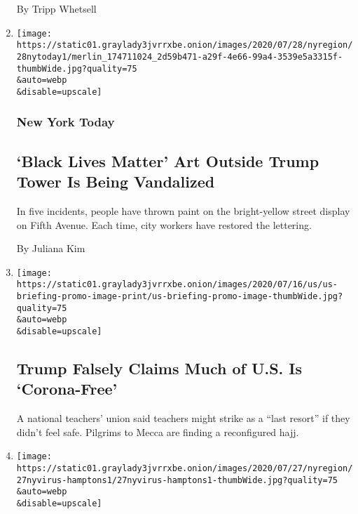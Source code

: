 \begin{enumerate}
  By Tripp Whetsell
\item
  \href{/2020/07/28/nyregion/blm-trump-tower.html}{}

  \texttt{[image: https://static01.graylady3jvrrxbe.onion/images/2020/07/28/nyregion/28nytoday1/merlin\_174711024\_2d59b471-a29f-4e66-99a4-3539e5a3315f-thumbWide.jpg?quality=75\\\&auto=webp\\\&disable=upscale]}

  \hypertarget{new-york-today-1}{%
  \subsubsection{New York Today}\label{new-york-today-1}}

  \hypertarget{black-lives-matter-art-outside-trump-tower-is-being-vandalized}{%
  \subsection{`Black Lives Matter' Art Outside Trump Tower Is Being
  Vandalized}\label{black-lives-matter-art-outside-trump-tower-is-being-vandalized}}

  In five incidents, people have thrown paint on the bright-yellow
  street display on Fifth Avenue. Each time, city workers have restored
  the lettering.

  By Juliana Kim
\item
  \href{/2020/07/28/world/coronavirus-covid-19.html}{}

  \texttt{[image: https://static01.graylady3jvrrxbe.onion/images/2020/07/16/us/us-briefing-promo-image-print/us-briefing-promo-image-thumbWide.jpg?quality=75\\\&auto=webp\\\&disable=upscale]}

  \hypertarget{trump-falsely-claims-much-of-us-is-corona-free}{%
  \subsection{Trump Falsely Claims Much of U.S. Is
  `Corona-Free'}\label{trump-falsely-claims-much-of-us-is-corona-free}}

  A national teachers' union said teachers might strike as a ``last
  resort'' if they didn't feel safe. Pilgrims to Mecca are finding a
  reconfigured hajj.
\item
  \href{/2020/07/27/nyregion/hamptons-chainsmokers-concert-social-distancing.html}{}

  \texttt{[image: https://static01.graylady3jvrrxbe.onion/images/2020/07/27/nyregion/27nyvirus-hamptons1/27nyvirus-hamptons1-thumbWide.jpg?quality=75\\\&auto=webp\\\&disable=upscale]}


\end{enumerate}
